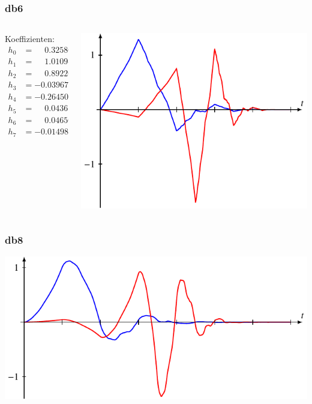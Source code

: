\begin{frame}
\frametitle{db6}
\begin{columns}[T]
\begin{column}{2.5cm}
Koeffizienten:
\[
\begin{aligned}
h_0&=\phantom{-}0.32580343\\
h_1&=\phantom{-}1.01094572\\
h_2&=\phantom{-}0.8922014\\
h_3&=-0.03967503\\
h_4&=-0.26450717\\
h_5&=\phantom{-}0.0436163\\
h_6&=\phantom{-}0.0465036\\
h_7&=-0.01498699
\end{aligned}
\]
\end{column}
\begin{column}{9.5cm}
\includegraphics{../../buch/chapters/7-algo/images/db3.pdf}
\end{column}
\end{columns}
\end{frame}

\begin{frame}
\frametitle{db8}
\begin{center}
\includegraphics{../../buch/chapters/7-algo/images/db4.pdf}
\end{center}
\end{frame}

